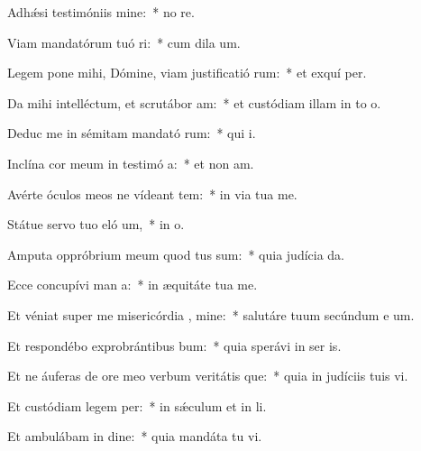 \item Adhǽsi testimóniis  mine:~* no  re.
\item Viam mandatórum tuó ri:~* cum dila  um.
\item Legem pone mihi, Dómine, viam justificatió rum:~* et exquí  per.
\item Da mihi intelléctum, et scrutábor  am:~* et custódiam illam in to  o.
\item Deduc me in sémitam mandató rum:~* qui  i.
\item Inclína cor meum in testimó a:~* et non  am.
\item Avérte óculos meos ne vídeant tem:~* in via tua  me.
\item Státue servo tuo eló um,~* in  o.
\item Amputa oppróbrium meum quod tus sum:~* quia judícia  da.
\item Ecce concupívi man a:~* in æquitáte tua  me.
\item Et véniat super me misericórdia , mine:~* salutáre tuum secúndum e um.
\item Et respondébo exprobrántibus  bum:~* quia sperávi in ser is.
\item Et ne áuferas de ore meo verbum veritátis que:~* quia in judíciis tuis vi.
\item Et custódiam legem  per:~* in sǽculum et in  li.
\item Et ambulábam in dine:~* quia mandáta tu vi.

